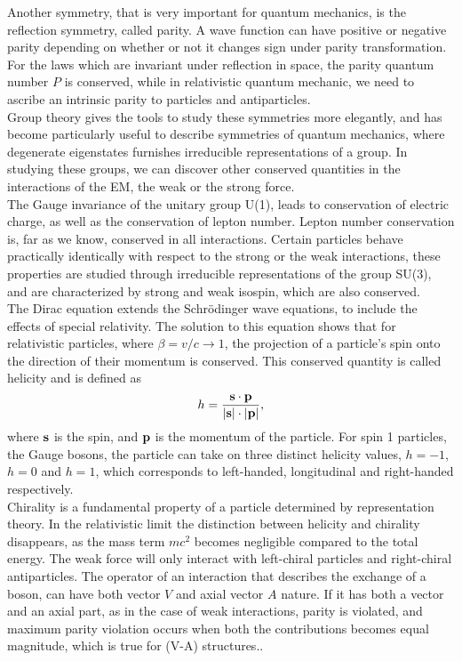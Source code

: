\documentclass[12pt,a4paper]{article}
\numberwithin{equation}{section}
\begin{document}
Another symmetry, that is very important for quantum mechanics, is the
reflection symmetry, called parity. A wave function can have positive or
negative parity depending on whether or not it changes sign under parity
transformation. For the laws which are invariant under reflection in space, the
parity quantum number $P$ is conserved, while in relativistic quantum mechanic,
we need to ascribe an intrinsic parity to particles and antiparticles.\\

Group theory gives the tools to study these symmetries more elegantly, and has
become particularly useful to describe symmetries of quantum mechanics, where
degenerate eigenstates furnishes irreducible representations of a group. In
studying these groups, we can discover other conserved quantities in the
interactions of the EM, the weak or the strong force.\\

The Gauge invariance of the unitary group U(1), leads to conservation of
electric charge, as well as the conservation of lepton number. Lepton number
conservation is, far as we know, conserved in all interactions. Certain
particles behave practically identically with respect to the strong or the weak
interactions, these properties are studied through irreducible representations
of the group SU(3), and are characterized by strong and weak isospin, which are
also conserved.\\

The Dirac equation extends the Schrödinger wave equations, to include the
effects of special relativity. The solution to this equation shows that for
relativistic particles, where $\beta = v/c \rightarrow 1$, the projection of a particle's spin
onto the direction of their momentum is conserved. This conserved quantity is
called helicity\cite[63]{Povh2015} and is defined as
\begin{equation}
  h = \frac{\vb{s \cdot p}}{\abs{\vb s} \cdot \abs{\vb p}},
\end{equation}
where $\vb s$ is the spin, and $\vb p$ is the momentum of the particle. For
spin 1 particles, the Gauge bosons, the particle can take on three distinct
helicity values, $h=-1$, $h=0$ and $h=1$, which corresponds to left-handed,
longitudinal and right-handed respectively.\\

Chirality is a fundamental property of a particle determined by representation
theory. In the relativistic limit the distinction between helicity and chirality
disappears, as the mass term $mc^2$ becomes negligible compared to the total
energy. The weak force will only interact with left-chiral particles and
right-chiral antiparticles. The operator of an interaction that describes the
exchange of a boson, can have both vector $V$ and axial vector $A$ nature. If it
has both a vector and an axial part, as in the case of weak interactions, parity
is violated, and maximum parity violation occurs when both the contributions
becomes equal magnitude, which is true for (V-A) structures..\\
\end{document}
